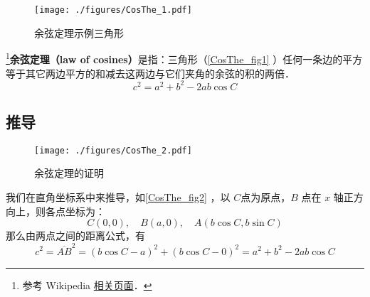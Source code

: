 
\begin{figure}[ht]
\centering
\texttt{[image: ./figures/CosThe\_1.pdf]}
\caption{余弦定理示例三角形} \label{CosThe_fig1}
\end{figure}

\footnote{参考 Wikipedia \href{https://en.wikipedia.org/wiki/Law_of_cosines}{相关页面}．}\textbf{余弦定理（law of cosines）}是指：三角形（\autoref{CosThe_fig1} ）任何一条边的平方等于其它两边平方的和减去这两边与它们夹角的余弦的积的两倍．
\begin{equation}\label{CosThe_eq1}
c^2=a^2 + b^2 - 2ab\cos C
\end{equation}


\subsection{推导}
\begin{figure}[ht]
\centering
\texttt{[image: ./figures/CosThe\_2.pdf]}
\caption{余弦定理的证明} \label{CosThe_fig2}
\end{figure}
我们在直角坐标系中来推导，如\autoref{CosThe_fig2} ，以 $C$点为原点，$B$ 点在 $x$ 轴正方向上，则各点坐标为：
\begin{equation}
C(0,0),\quad B(a,0),\quad A(b\cos C,b\sin C)
\end{equation}
那么由两点之间的距离公式，有
\begin{equation}
c^2=\overline{AB}^2=(b\cos C-a)^2+(b\cos C-0)^2=a^2+b^2-2ab\cos C
\end{equation}

